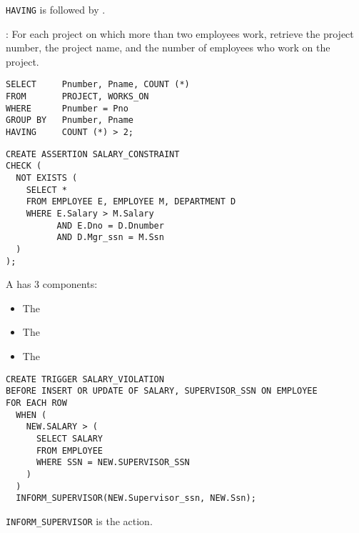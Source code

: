   \par \lstinline{HAVING} is followed by .
  \par {}: For each project on which more than two employees work, retrieve the project number, the project name, and the number of employees who work on the project.
    \begin{lstlisting}
SELECT     Pnumber, Pname, COUNT (*)
FROM       PROJECT, WORKS_ON
WHERE      Pnumber = Pno
GROUP BY   Pnumber, Pname
HAVING     COUNT (*) > 2;
    \end{lstlisting}


    \begin{lstlisting}
CREATE ASSERTION SALARY_CONSTRAINT
CHECK (
  NOT EXISTS (
    SELECT *
    FROM EMPLOYEE E, EMPLOYEE M, DEPARTMENT D
    WHERE E.Salary > M.Salary
          AND E.Dno = D.Dnumber
          AND D.Mgr_ssn = M.Ssn
  )
);
    \end{lstlisting}

  \par A  has 3 components:
  \begin{itemize}
    \item The 
    \item The 
    \item The 
  \end{itemize}
    \begin{lstlisting}
CREATE TRIGGER SALARY_VIOLATION
BEFORE INSERT OR UPDATE OF SALARY, SUPERVISOR_SSN ON EMPLOYEE
FOR EACH ROW
  WHEN (
    NEW.SALARY > (
      SELECT SALARY
      FROM EMPLOYEE
      WHERE SSN = NEW.SUPERVISOR_SSN
    )
  )
  INFORM_SUPERVISOR(NEW.Supervisor_ssn, NEW.Ssn);
    \end{lstlisting}
  \par \lstinline{INFORM_SUPERVISOR} is the action.